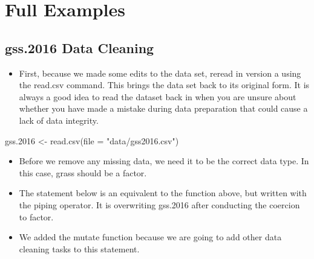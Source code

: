 \documentclass[
  letterpaper,
  DIV=11,
  numbers=noendperiod]{scrreprt}
\newenvironment{Shaded}{\begin{snugshade}}{\end{snugshade}}
\newcommand{\AttributeTok}[1]{\textcolor[rgb]{0.40,0.45,0.13}{#1}}
\newcommand{\CommentTok}[1]{\textcolor[rgb]{0.37,0.37,0.37}{#1}}
\newcommand{\FloatTok}[1]{\textcolor[rgb]{0.68,0.00,0.00}{#1}}
\newcommand{\FunctionTok}[1]{\textcolor[rgb]{0.28,0.35,0.67}{#1}}
\newcommand{\NormalTok}[1]{\textcolor[rgb]{0.00,0.23,0.31}{#1}}
\newcommand{\OtherTok}[1]{\textcolor[rgb]{0.00,0.23,0.31}{#1}}
\newcommand{\SpecialCharTok}[1]{\textcolor[rgb]{0.37,0.37,0.37}{#1}}
\newcommand{\StringTok}[1]{\textcolor[rgb]{0.13,0.47,0.30}{#1}}
\providecommand{\tightlist}{%
  \setlength{\itemsep}{0pt}\setlength{\parskip}{0pt}}\usepackage{longtable,booktabs,array}
\begin{document}
\section{Full Examples}\label{full-examples}

\subsection{gss.2016 Data Cleaning}\label{gss.2016-data-cleaning}

\begin{itemize}
\tightlist
\item
  First, because we made some edits to the data set, reread in version a
  using the read.csv command. This brings the data set back to its
  original form. It is always a good idea to read the dataset back in
  when you are unsure about whether you have made a mistake during data
  preparation that could cause a lack of data integrity.\\
\end{itemize}

\begin{Shaded}
\begin{Highlighting}[]
\NormalTok{gss}\FloatTok{.2016} \OtherTok{\textless{}{-}} \FunctionTok{read.csv}\NormalTok{(}\AttributeTok{file =} \StringTok{"data/gss2016.csv"}\NormalTok{)}
\end{Highlighting}
\end{Shaded}

\begin{itemize}
\tightlist
\item
  Before we remove any missing data, we need it to be the correct data
  type. In this case, grass should be a factor.
\end{itemize}

\begin{Shaded}
\end{Shaded}

\begin{itemize}
\tightlist
\item
  The statement below is an equivalent to the function above, but
  written with the piping operator. It is overwriting gss.2016 after
  conducting the coercion to factor.
\item
  We added the mutate function because we are going to add other data
  cleaning tasks to this statement.
\end{itemize}
\end{document}
